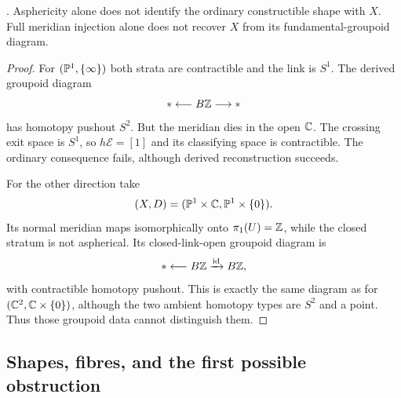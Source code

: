 \begin{counterexample}\label{P1c2}
.
Asphericity alone does not identify the ordinary constructible
shape with $X$. Full meridian injection alone does not recover
$X$ from its fundamental-groupoid diagram.
\end{counterexample}
\begin{proof}
For $(\mathbb P^1,\{\infty\})$ both strata are contractible
and the link is $S^1$. The derived groupoid diagram
\[
                    *\longleftarrow B\mathbb Z\longrightarrow *
\]
has homotopy pushout $S^2$. But the meridian dies
in the open $\mathbb C$. The crossing exit space is $S^1$,
so $h\mathcal E=[1]$ and its classifying space is
contractible. The ordinary consequence fails,
although derived reconstruction succeeds.

For the other direction take
\[
             (X,D)=(\mathbb P^1\times\mathbb C,\mathbb P^1\times\{0\}).
\]
Its normal meridian maps isomorphically onto
$\pi_1(U)=\mathbb Z$, while the closed stratum is
not aspherical. Its closed-link-open groupoid
diagram is
\[
                 *\longleftarrow B\mathbb Z\xrightarrow{\mathrm{id}}B\mathbb Z ,
\]
with contractible homotopy pushout.
This is exactly the same diagram as for
$(\mathbb C^2,\mathbb C\times\{0\})$, although the two
ambient homotopy types are $S^2$ and a point.
Thus those groupoid data cannot distinguish them.
\end{proof}

\subsection{Shapes, fibres, and the first possible obstruction}

